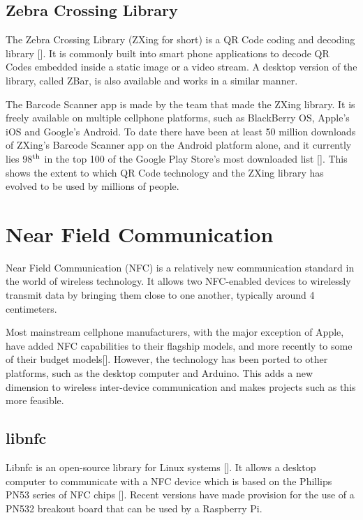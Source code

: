 \subsection{Zebra Crossing Library}
\label{sec:zbar}

The Zebra Crossing Library (ZXing for short) is a QR Code coding and decoding
library [\cite{website:zxing}]. It is commonly built into smart phone
applications to decode QR Codes embedded inside a static image or a video
stream. A desktop version of the library, called ZBar, is also available and
works in a similar manner.

The Barcode Scanner app is made by the team that made the ZXing library. It is freely
available on multiple cellphone platforms, such as BlackBerry OS, Apple's iOS and Google's
Android. To date there have been at least 50 million downloads of ZXing's Barcode Scanner
app on the Android platform alone, and it currently lies 98$^{\rm th}$ in the
top 100 of the Google Play Store's most downloaded list
[\cite{website:barcodescanner}]. This shows the extent to which QR Code
technology and the ZXing library has evolved to be used by millions of people.

\section{Near Field Communication}

Near Field Communication (NFC) is a relatively new communication standard in the world of
wireless technology. It allows two NFC-enabled devices to wirelessly transmit data by bringing
them close to one another, typically around 4 centimeters.

Most mainstream cellphone manufacturers, with the major exception of Apple, have
added NFC capabilities to their flagship models, and more recently to some of
their budget models[\cite{website:nfc-models}]. However, the technology has been
ported to other platforms, such as the desktop computer and Arduino. This adds a
new dimension to wireless inter-device communication and makes projects such as
this more feasible.

\subsection{libnfc}

Libnfc is an open-source library for Linux systems [\cite{website:libnfc}]. It allows a
desktop computer to communicate with a NFC device which is based on the Phillips PN53
series of NFC chips [\cite{website:libnfc-hardware}]. Recent versions have made provision
for the use of a PN532 breakout board that can be used by a Raspberry Pi. 

